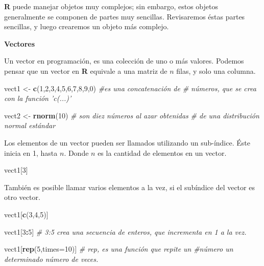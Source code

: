 \documentclass[12pt,letterpaper,]{book}
\newenvironment{Shaded}{\begin{snugshade}}{\end{snugshade}}
\newcommand{\KeywordTok}[1]{\textcolor[rgb]{0.13,0.29,0.53}{\textbf{#1}}}
\newcommand{\DataTypeTok}[1]{\textcolor[rgb]{0.13,0.29,0.53}{#1}}
\newcommand{\DecValTok}[1]{\textcolor[rgb]{0.00,0.00,0.81}{#1}}
\newcommand{\StringTok}[1]{\textcolor[rgb]{0.31,0.60,0.02}{#1}}
\newcommand{\CommentTok}[1]{\textcolor[rgb]{0.56,0.35,0.01}{\textit{#1}}}
\newcommand{\OperatorTok}[1]{\textcolor[rgb]{0.81,0.36,0.00}{\textbf{#1}}}
\newcommand{\NormalTok}[1]{#1}
\begin{document}
\textbf{R} puede manejar objetos muy complejos; sin embargo, estos
objetos generalmente se componen de partes muy sencillas. Revisaremos
éstas partes sencillas, y luego crearemos un objeto más complejo.

\textbf{Vectores}

Un vector en programación, es una colección de uno o más valores.
Podemos pensar que un vector en \textbf{R} equivale a una matriz de
\(n\) filas, y solo una columna.

\begin{Shaded}
\begin{Highlighting}[]
\NormalTok{vect1 <-}\StringTok{ }\KeywordTok{c}\NormalTok{(}\DecValTok{1}\NormalTok{,}\DecValTok{2}\NormalTok{,}\DecValTok{3}\NormalTok{,}\DecValTok{4}\NormalTok{,}\DecValTok{5}\NormalTok{,}\DecValTok{6}\NormalTok{,}\DecValTok{7}\NormalTok{,}\DecValTok{8}\NormalTok{,}\DecValTok{9}\NormalTok{,}\DecValTok{0}\NormalTok{) }\CommentTok{#es una concatenación de}
\CommentTok{# números, que se crea con la función 'c(...)'}

\NormalTok{vect2 <-}\StringTok{ }\KeywordTok{rnorm}\NormalTok{(}\DecValTok{10}\NormalTok{) }\CommentTok{# son diez números al azar obtenidas}
\CommentTok{# de una distribución normal estándar}
\end{Highlighting}
\end{Shaded}

Los elementos de un vector pueden ser llamados utilizando un sub-índice.
Éste inicia en 1, hasta \(n\). Donde \(n\) es la cantidad de elementos
en un vector.

\begin{Shaded}
\begin{Highlighting}[]
\NormalTok{vect1[}\DecValTok{3}\NormalTok{]}
\end{Highlighting}
\end{Shaded}

También es posible llamar varios elementos a la vez, si el subíndice del
vector es otro vector.

\begin{Shaded}
\begin{Highlighting}[]
\NormalTok{vect1[}\KeywordTok{c}\NormalTok{(}\DecValTok{3}\NormalTok{,}\DecValTok{4}\NormalTok{,}\DecValTok{5}\NormalTok{)]}

\NormalTok{vect1[}\DecValTok{3}\OperatorTok{:}\DecValTok{5}\NormalTok{] }
\CommentTok{# 3:5 crea una secuencia de enteros, que incrementa en 1 a la vez.}

\NormalTok{vect1[}\KeywordTok{rep}\NormalTok{(}\DecValTok{5}\NormalTok{,}\DataTypeTok{times=}\DecValTok{10}\NormalTok{)] }\CommentTok{# rep, es una función que repite un}
\CommentTok{#número un determinado número de veces.}
\end{Highlighting}
\end{Shaded}
\end{document}

